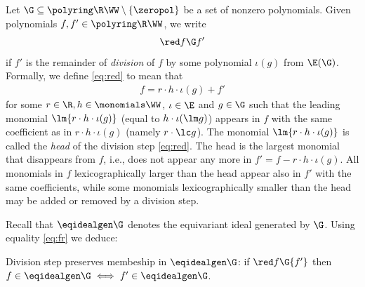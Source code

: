 %
Let $\G \subseteq \polyring\R \WW \setminus\{\zeropol\}$ be a  set of nonzero polynomials.
Given polynomials $f,f' \in \polyring \R \WW$,
we write
\begin{align}\label{eq:red}
\red f \G f'
\end{align}
if $f'$ is the remainder of \emph{division} of $f$ by some polynomial $\iota(g)$ from $\E(\G)$.
Formally, we define \eqref{eq:red} to mean that 
\begin{align} \label{eq:fr}
f = r\cdot h \cdot \iota(g) + f'
\end{align}
for some $r\in \R, h \in \monomials \WW$, $\iota \in \E$ and $g \in \G$ such that
the leading monomial 
$\lm {r\cdot h\cdot \iota(g)}$ (equal to $h\cdot \iota(\lm g)$)
appears in $f$ with the same coefficient as in $r\cdot h\cdot \iota(g)$
(namely $r\cdot \lc g$).
The monomial $\lm {r\cdot h\cdot \iota(g)}$ %
is called the \emph{head} of the division step \eqref{eq:red}.
The head is the largest monomial that disappears from $f$, i.e., does not appear any more
in $f' = f - r\cdot h\cdot\iota(g)$.
All monomials in $f$ lexicographically larger than the head appear also in $f'$
with the same coefficients, while
some monomials lexicographically smaller than the head 
may be added or removed by a division step.
%

Recall that $\eqidealgen\G$ denotes the equivariant ideal generated by $\G$. 
Using equality \eqref{eq:fr} we deduce:
%
\begin{lemma} \label{lem:red pres G}
Division step preserves membeship in $\eqidealgen\G$: 
if $\red f \G {f'}$ then $f\in\eqidealgen\G \iff f'\in\eqidealgen\G$.
\end{lemma}
%

%
%

